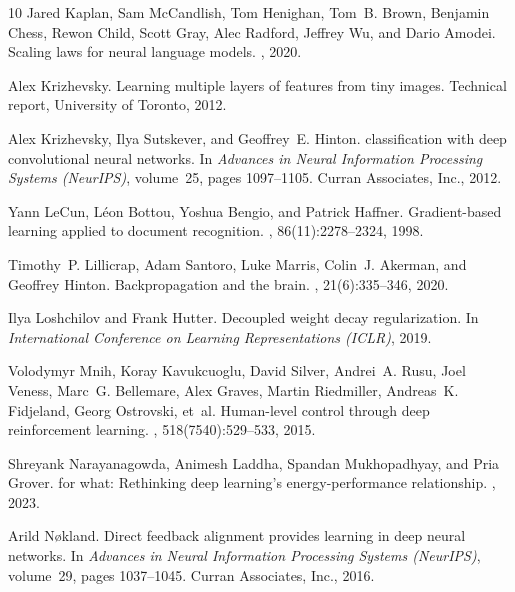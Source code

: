\documentclass[11pt, english]{article}
\begin{document}
\begin{thebibliography}{10}
Jared Kaplan, Sam McCandlish, Tom Henighan, Tom~B. Brown, Benjamin Chess, Rewon
  Child, Scott Gray, Alec Radford, Jeffrey Wu, and Dario Amodei.
\newblock Scaling laws for neural language models.
, 2020.

Alex Krizhevsky.
\newblock Learning multiple layers of features from tiny images.
\newblock Technical report, University of Toronto, 2012.

Alex Krizhevsky, Ilya Sutskever, and Geoffrey~E. Hinton.
 classification with deep convolutional neural networks.
\newblock In {\em Advances in Neural Information Processing Systems (NeurIPS)},
  volume~25, pages 1097--1105. Curran Associates, Inc., 2012.

Yann LeCun, L{\'e}on Bottou, Yoshua Bengio, and Patrick Haffner.
\newblock Gradient-based learning applied to document recognition.
, 86(11):2278--2324, 1998.

Timothy~P. Lillicrap, Adam Santoro, Luke Marris, Colin~J. Akerman, and Geoffrey
  Hinton.
\newblock Backpropagation and the brain.
, 21(6):335--346, 2020.

Ilya Loshchilov and Frank Hutter.
\newblock Decoupled weight decay regularization.
\newblock In {\em International Conference on Learning Representations (ICLR)},
  2019.

Volodymyr Mnih, Koray Kavukcuoglu, David Silver, Andrei~A. Rusu, Joel Veness,
  Marc~G. Bellemare, Alex Graves, Martin Riedmiller, Andreas~K. Fidjeland,
  Georg Ostrovski, et~al.
\newblock Human-level control through deep reinforcement learning.
, 518(7540):529--533, 2015.

Shreyank Narayanagowda, Animesh Laddha, Spandan Mukhopadhyay, and Pria Grover.
 for what: Rethinking deep learning's energy-performance
  relationship.
, 2023.


Arild N{\o}kland.
\newblock Direct feedback alignment provides learning in deep neural networks.
\newblock In {\em Advances in Neural Information Processing Systems (NeurIPS)},
  volume~29, pages 1037--1045. Curran Associates, Inc., 2016.


\end{thebibliography}
\end{document}
